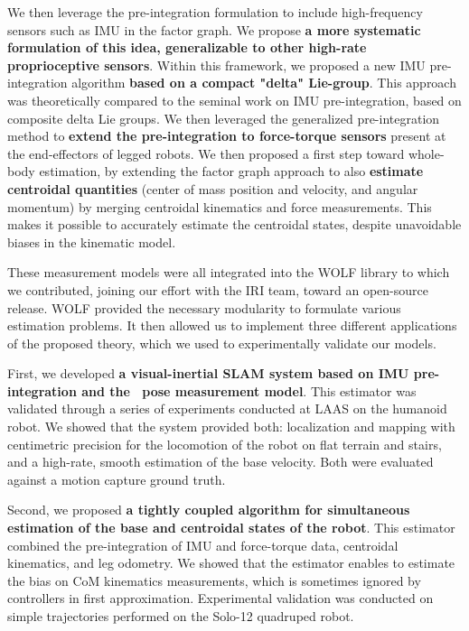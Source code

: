 We then leverage the pre-integration formulation to include high-frequency sensors such as IMU in the factor graph. We propose 
\textbf{a more systematic formulation of this idea, generalizable to other high-rate proprioceptive sensors}. Within this framework, we proposed a new 
IMU pre-integration algorithm \textbf{based on a compact "delta" Lie-group}.
This approach was theoretically compared to the seminal work on IMU pre-integration, based on composite delta Lie groups. 
We then leveraged the generalized pre-integration method to \textbf{extend the pre-integration to force-torque sensors} present at the end-effectors of
legged robots. 
We then proposed a first step toward whole-body estimation, by extending the factor graph approach to also \textbf{estimate centroidal quantities}
(center of mass position and velocity, and angular momentum) by merging centroidal kinematics and force measurements. This makes it possible 
to accurately estimate the centroidal states, despite unavoidable biases in the kinematic model. 


These measurement models were all integrated into the WOLF library \cite{sola2021wolf} to which we contributed, joining our effort with the IRI team, 
toward an open-source release. WOLF provided the necessary modularity to formulate various estimation problems. 
It then allowed us to implement three different applications of the proposed theory, which we used to experimentally validate our models.

\bigskip

First, we developed \textbf{a visual-inertial SLAM system based on IMU pre-integration and the \apriltag\ pose measurement model}. This estimator was validated through
a series of experiments conducted at LAAS on the  humanoid robot. We showed that the system provided both: localization and mapping with centimetric precision
for the locomotion of the robot on flat terrain and stairs, and a high-rate, smooth estimation of the base velocity. Both were evaluated against a motion capture 
ground truth. 

Second, we proposed \textbf{a tightly coupled algorithm for simultaneous estimation of the base and centroidal states of the robot}. This estimator combined the pre-integration 
of IMU and force-torque data, centroidal kinematics, and leg odometry. We showed that the estimator enables to estimate the bias on CoM kinematics measurements, which is sometimes ignored
by controllers in first approximation. Experimental validation was conducted on simple trajectories performed on the Solo-12 quadruped robot. 

